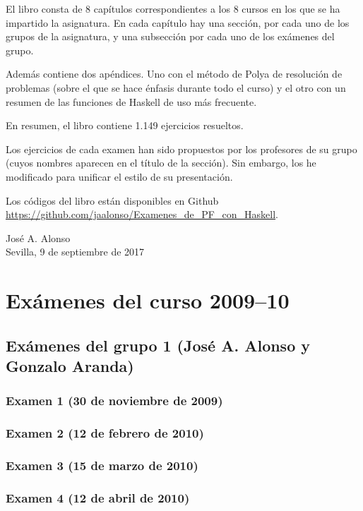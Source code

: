 \documentclass[a4paper,12pt,twoside]{book}
\begin{document}
El libro consta de 8 capítulos correspondientes a los 8 cursos en los que
se ha impartido la asignatura. En cada capítulo hay una sección, por
cada uno de los grupos de la asignatura, y una subsección por cada uno de los
exámenes del grupo.  

Además contiene dos apéndices. Uno con el método de Polya de resolución de
problemas (sobre el que se hace énfasis durante todo el curso) y el otro con un
resumen de las funciones de Haskell de uso más frecuente.

En resumen, el libro contiene 1.149 ejercicios resueltos.

Los ejercicios de cada examen han sido propuestos por los profesores de su
grupo (cuyos nombres aparecen en el título de la sección). Sin embargo, los he
modificado para unificar el estilo de su presentación.

Los códigos del libro están disponibles en Github
\href{https://github.com/jaalonso/Examenes_de_PF_con_Haskell}
     {\url{https://github.com/jaalonso/Examenes_de_PF_con_Haskell}}.

\begin{flushright}
  José A. Alonso \\
  Sevilla, 9 de septiembre de 2017
\end{flushright}

\chapter{Exámenes del curso 2009--10}

\section{Exámenes del grupo 1 (José A. Alonso y Gonzalo Aranda)}
\subsection{Examen 1 (30 de noviembre de 2009)}
\subsection{Examen 2 (12 de febrero de 2010)}
\subsection{Examen 3 (15 de marzo de 2010)}
\subsection{Examen 4 (12 de abril de 2010)} 
\end{document}
